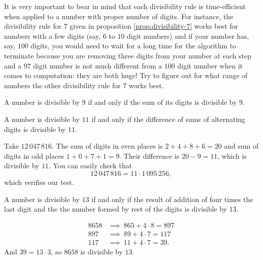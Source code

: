 \documentclass{subfile}
\begin{document}
It is very important to bear in mind that each divisibility rule is time-efficient when applied to a number with proper number of digits. For instance, the divisibility rule for $7$ given in proposition \eqref{prop:divisibility-7} works best for numbers with a few digits (say, $6$ to $10$ digit numbers) and if your number has, say, $100$ digits, you would need to wait for a long time for the algorithm to terminate because you are removing three digits from your number at each step and a $97$ digit number is not much different from a $100$ digit number when it comes to computation: they are both huge! Try to figure out for what range of numbers the other divisibility rule for $7$ works best.

	\begin{proposition}[Divisibility by $9$]
		A number is divisible by $9$ if and only if the sum of its digits is divisible by $9$.
	\end{proposition}


	\begin{proposition}[Divisibility by $11$]
		A number is divisible by $11$ if and only if the difference of sums of alternating digits is divisible by $11$.
	\end{proposition}

	\begin{example}
		Take $12 \, 047 \, 816$. The sum of digits in even places is $2+4+8+6=20$ and sum of digits in odd places $1+0+7+1=9$. Their difference is $20-9=11$, which is divisible by $11$. You can easily check that $$12 \, 047 \, 816=11\cdot1 \,095\, 256,$$ which verifies our test.
	\end{example}

	\begin{proposition}[Divisibility by $13$]
		A number is divisible by $13$ if and only if the result of addition of four times the last digit and the the number formed by rest of the digits is divisible by $13$.
	\end{proposition}

	\begin{example}
		\begin{align*}
			8658 & \implies \ 865 + 4 \cdot 8 = 897 \\
			897 & \implies  \ 89 + 4 \cdot 7 =   117 \\
			117 & \implies \ 11 + 4 \cdot 7 =  39.
		\end{align*}
		And $39 = 13 \cdot 3$, so $8658$ is divisible by $13$.
	\end{example}
\end{document}
